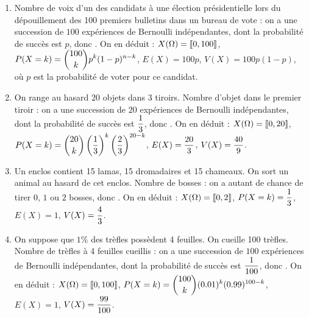 \documentclass[a4paper, 11pt,reqno]{article}
\begin{document}
\begin{correction}
\begin{enumerate}
		\item Nombre de voix d'un des candidats \`a une \'election pr\'esidentielle lors du d\'epouillement des 100 premiers bulletins dans un bureau de vote : on a une succession de $100$ exp\'eriences de Bernoulli ind\'ependantes, dont la probabilit\'e de succ\`es est $p$, donc . On en d\'eduit : $X(\Omega) = \llbracket  0, 100 \rrbracket$, $P(X=k) = \displaystyle \binom{100}{k} p^k (1-p)^{n-k}$,  $E(X) = 100 p$, $V(X) = 100 p (1-p)$, o\`u $p$ est la probabilit\'e de voter pour ce candidat.
		\item On range au hasard $20$ objets dans $3$ tiroirs. Nombre d'objet dans le premier tiroir : on a une succession de $20$ exp\'eriences de Bernoulli ind\'ependantes, dont la probabilit\'e de succ\`es est $\displaystyle \frac{1}{3}$, donc . On en d\'eduit : $X(\Omega) = \llbracket  0, 20 \rrbracket$, $P(X=k) = \displaystyle \binom{20}{k} \left(\frac{1}{3}\right)^k \left(\frac{2}{3}\right)^{20-k}$,  $E(X) = \displaystyle \frac{20}{3}$, $V(X) =\displaystyle \frac{40}{9}$.
		\item Un enclos contient 15 lamas, 15 dromadaires et 15 chameaux. On sort un animal au hasard de cet enclos. Nombre de bosses : on a autant de chance de tirer $0$, $1$ ou $2$ bosses, donc . On en d\'eduit : $X(\Omega) = \llbracket  0, 2 \rrbracket$, $P(X=k) = \displaystyle \frac{1}{3}$,  $E(X) = 1$, $\displaystyle V(X) = \frac{4}{3}$.
		\item On suppose que $1\%$ des tr\`efles poss\`edent 4 feuilles. On cueille 100 tr\`efles. Nombre de tr\`efles \`a 4 feuilles cueillis : on a une succession de $100$ exp\'eriences de Bernoulli ind\'ependantes, dont la probabilit\'e de succ\`es est $\displaystyle\frac{1}{100}$, donc . On en d\'eduit : $X(\Omega) = \llbracket  0, 100 \rrbracket$, $P(X=k) = \displaystyle \binom{100}{k} (0.01)^k (0.99)^{100-k}$,  $E(X) = 1$, $V(X) = \displaystyle \frac{99}{100}$.

\end{enumerate}
\end{correction}
\end{document}
